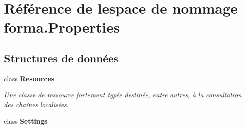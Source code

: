 \hypertarget{namespaceforma_1_1_properties}{}\section{Référence de l\textquotesingle{}espace de nommage forma.\+Properties}
\label{namespaceforma_1_1_properties}
\subsection*{Structures de données}
\begin{DoxyCompactItemize}
\item 
class {\bfseries Resources}
\begin{DoxyCompactList}\small\item\em Une classe de ressource fortement typée destinée, entre autres, à la consultation des chaînes localisées. \end{DoxyCompactList}\item 
class {\bfseries Settings}
\end{DoxyCompactItemize}
